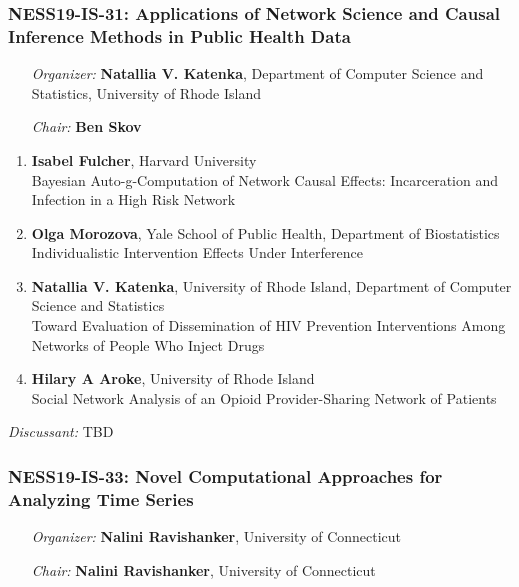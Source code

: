 \subsubsection*{NESS19-IS-31: Applications of Network Science and Causal Inference Methods in Public Health Data}

\begin{enumerate}[align=left]
\item [\emph{Organizer:}] \textbf{Natallia V. Katenka}, Department of Computer Science and Statistics, University of Rhode Island \\
\item [\emph{Chair:}] \textbf{Ben Skov}
\end{enumerate}

\begin{enumerate}
\item \textbf{Isabel Fulcher}, Harvard University \\
Bayesian Auto-g-Computation of Network Causal Effects: Incarceration and Infection in a High Risk Network
\item \textbf{Olga Morozova}, Yale School of Public Health, Department of Biostatistics \\
Individualistic Intervention Effects Under Interference
\item \textbf{Natallia V. Katenka}, University of Rhode Island, Department of Computer Science and Statistics \\
Toward Evaluation of Dissemination of HIV Prevention Interventions Among Networks of People Who Inject Drugs
\item \textbf{Hilary A Aroke}, University of Rhode Island \\
Social Network Analysis of an Opioid Provider-Sharing Network of Patients
\end{enumerate}

\emph{Discussant:} TBD

\subsubsection*{NESS19-IS-33: Novel Computational Approaches for Analyzing Time Series}

\begin{enumerate}[align=left]
\item [\emph{Organizer:}] \textbf{Nalini Ravishanker}, University of Connecticut \\
\item [\emph{Chair:}] \textbf{Nalini Ravishanker}, University of Connecticut
\end{enumerate}

